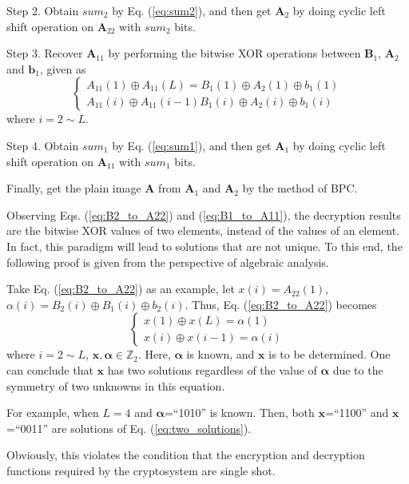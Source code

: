 \documentclass[final,3p,times]{elsarticle}
\begin{document}
\begin{itemize}
	Step 2. Obtain $sum_2$ by Eq. (\ref{eq:sum2}), and then get $\bm{A}_{2}$ by doing cyclic left shift operation on $\bm{A}_{22}$ with $sum_2$ bits.
	
	Step 3. Recover $\bm{A}_{11}$ by performing the bitwise XOR operations between $\bm{B}_{1}$, $\bm{A}_{2}$ and $\bm{b}_{1}$, given as
	\begin{equation}
	\left\{ \begin{array}{l}
	A_{11}(1) \oplus A_{11}(L) = B_1(1) \oplus A_{2}(1) \oplus b_{1}(1)\\
	A_{11}(i) \oplus A_{11}(i-1) B_1(i) \oplus A_{2}(i) \oplus b_{1}(i)
	\end{array} \right.
	\label{eq:B1_to_A11}
	\end{equation}
	where $i=2 \sim L$.
	
	Step 4. Obtain $sum_1$ by Eq. (\ref{eq:sum1}), and then get $\bm{A}_{1}$ by doing cyclic left shift operation on $\bm{A}_{11}$ with $sum_1$ bits.
	
	Finally, get the plain image $\bm{A}$ from $\bm{A}_1$ and $\bm{A}_2$ by the method of BPC.
\end{itemize}

Observing Eqs. (\ref{eq:B2_to_A22}) and (\ref{eq:B1_to_A11}), the decryption results are the bitwise XOR values of two elements, instead of the values of an element. In fact, this paradigm will lead to solutions that are not unique. To this end, the following proof is given from the perspective of algebraic analysis. 

Take Eq. (\ref{eq:B2_to_A22}) as an example, let $x(i)=A_{22}(1)$, $\alpha(i)=B_2(i) \oplus B_{1}(i) \oplus b_{2}(i)$. Thus, Eq. (\ref{eq:B2_to_A22}) becomes
\begin{equation}
\left\{ \begin{array}{l}
x(1) \oplus x(L)  = \alpha(1)\\
x(i) \oplus x(i-1) = \alpha(i)
\end{array} \right.
\label{eq:two_solutions}
\end{equation}
where $i=2 \sim L$, $\bm{x},\bm{\alpha} \in \mathbb{Z}_{2}$. Here, $\bm{\alpha}$ is known, and $\bm{x}$ is to be determined.
One can conclude that $\bm{x}$ has two solutions regardless of the value of $\bm{\alpha}$ due to the symmetry of two unknowns in this equation.

For example, when $L=4$ and $\bm{\alpha}$=``1010'' is known. Then, both $\bm{x}$=``1100'' and $\bm{x}$=``0011'' are solutions of Eq. (\ref{eq:two_solutions}).

Obviously, this violates the condition that the encryption and decryption functions required by the cryptosystem are single shot.
\end{document}
